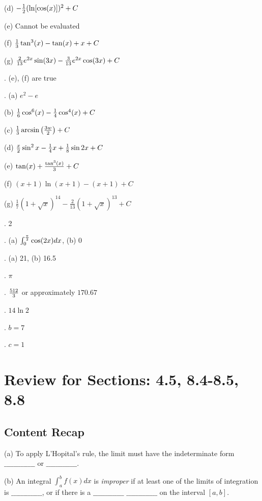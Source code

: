 \documentclass[12pt]{article}
\begin{document}
\noindent (d) $-{{1}\over{2}} (\ln [\cos(x)])^2 + C$

\noindent (e) Cannot be evaluated

\noindent (f) ${{1}\over{3}} \tan^3 (x) - \tan (x) + x + C$

\noindent (g) ${{2}\over{13}} e^{2x} \sin(3x) - {{3}\over{13}} e^{2x} \cos(3x) +
C$

.  (e), (f) are true

.  (a)  $e^2-e$

\noindent (b)  ${{1}\over{6}}\cos^6(x)-{{1}\over{4}}\cos^4(x)+C$

\noindent (c)  ${{1}\over{3}} \arcsin \left ( {{3w}\over{2}} \right ) +C$

\noindent (d)  ${{x}\over{2}} \sin^2 x - {{1}\over{4}}x + {{1}\over{8}}\sin 2x +C$

\noindent (e)  $\tan(x)+{{\tan^3(x)}\over{3}}+C$

\noindent (f) $(x+1) \ln (x+1) - (x+1) + C$

\noindent (g) $\frac{1}{7}(1+\sqrt{x})^{14} - \frac{2}{13}(1+\sqrt{x})^{13} + C$

.  2

.  (a) $\int_{0}^{{\pi}\over{2}} \cos(2x) dx$, (b) 0

.  (a) 21, (b) 16.5

.  $\pi$

.  ${{512}\over{3}}$ or approximately $170.67$

.  $14 \ln 2$

.  $b=7$

.  $c=1$

\section{Review for Sections: 4.5, 8.4-8.5, 8.8}

\subsection*{Content Recap}

\noindent (a) To 
apply L'Hopital's rule, the limit must have 
the indeterminate form 
$\_\_\_\_\_\_\_\_\_\_\_\_\_$ or $\_\_\_\_\_\_\_\_\_\_\_\_\_$.

\bigskip
\noindent (b) An integral $\int_a^b f(x) dx$ is {\it improper\/} if at 
least one of the 
limits of integration is \hfil\break $\_\_\_\_\_\_\_\_\_\_\_\_\_$, or if 
there is a
$\_\_\_\_\_\_\_\_\_\_\_\_\_$ $\_\_\_\_\_\_\_\_\_\_\_\_\_$ on the interval 
$[a,b]$.
\end{document}

